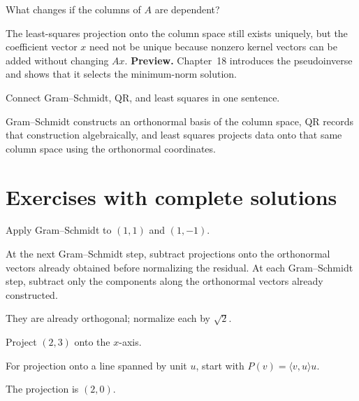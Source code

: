 \begin{problem}\label{prob:i14-problem-11}
What changes if the columns of $A$ are dependent?
\end{problem}
\begin{solution}
The least-squares projection onto the column space still exists uniquely, but the coefficient vector $x$ need not be unique because nonzero kernel vectors can be added without changing $Ax$. \textbf{Preview.} Chapter~18 introduces the pseudoinverse and shows that it selects the minimum-norm solution.
\end{solution}

\begin{problem}\label{prob:i14-problem-12}
Connect Gram–Schmidt, QR, and least squares in one sentence.
\end{problem}
\begin{solution}
Gram–Schmidt constructs an orthonormal basis of the column space, QR records that construction algebraically, and least squares projects data onto that same column space using the orthonormal coordinates.
\end{solution}


\section{Exercises with complete solutions}

\begin{exercise}\label{exr:i14-01}
Apply Gram–Schmidt to $(1,1)$ and $(1,-1)$.
\end{exercise}
\begin{hint}
At the next Gram--Schmidt step, subtract projections onto the orthonormal vectors already obtained before normalizing the residual. At each Gram--Schmidt step, subtract only the components along the orthonormal vectors already constructed.
\end{hint}
\begin{solution}
They are already orthogonal; normalize each by $\sqrt2$.
\end{solution}

\begin{exercise}\label{exr:i14-02}
Project $(2,3)$ onto the $x$-axis.
\end{exercise}
\begin{hint}
For projection onto a line spanned by unit \(u\), start with \(P(v)=\langle v,u\rangle u\).
\end{hint}
\begin{solution}
The projection is $(2,0)$.
\end{solution}

